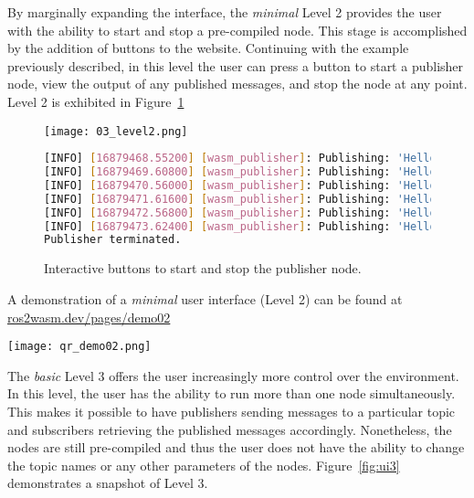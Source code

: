         By marginally expanding the interface, the \textit{minimal} Level 2 provides
        the user with the ability to start and stop a pre-compiled node. This 
        stage is accomplished by the addition of buttons to the website. Continuing
        with the example previously described, in this level the user can press
        a button to start a publisher node, view the output of any published 
        messages, and stop the node at any point. Level 2 is exhibited in Figure~\ref{fig:ui2}

        \begin{figure}[htbp]
            \centering
            \texttt{[image: 03\_level2.png]}
            \begin{lstlisting}[language=Bash]
[INFO] [16879468.55200] [wasm_publisher]: Publishing: 'Hello there! 13'
[INFO] [16879469.60800] [wasm_publisher]: Publishing: 'Hello there! 14'
[INFO] [16879470.56000] [wasm_publisher]: Publishing: 'Hello there! 15'
[INFO] [16879471.61600] [wasm_publisher]: Publishing: 'Hello there! 16'
[INFO] [16879472.56800] [wasm_publisher]: Publishing: 'Hello there! 17'
[INFO] [16879473.62400] [wasm_publisher]: Publishing: 'Hello there! 18'
Publisher terminated.\end{lstlisting}
            \caption{Interactive buttons to start and stop the publisher node.}\label{fig:ui2}
        \end{figure}

        \begin{tcolorbox}[title=Example 2]
            \begin{minipage}[t]{0.87\linewidth}
                \vspace*{0.5\baselineskip}
                A demonstration of a \textit{minimal} user interface (Level 2) can
                be found at \href{https://ros2wasm.dev/pages/demo02/index.html}{\textsf{ros2wasm.dev/pages/demo02}}
            \end{minipage}\hfill%
            \begin{minipage}[t]{0.1\linewidth}
                \vspace*{0pt}
                \texttt{[image: qr\_demo02.png]}
            \end{minipage}
        \end{tcolorbox}



        The \textit{basic} Level 3 offers the user increasingly more control over
        the environment. In this level, the user has the ability to run more than
        one node simultaneously. This makes it possible to have publishers sending
        messages to a particular topic and subscribers retrieving the published
        messages accordingly. Nonetheless, the nodes are still pre-compiled and 
        thus the user does not have the ability to change the topic names or any
        other parameters of the nodes. Figure~\ref{fig:ui3} demonstrates a snapshot 
        of Level 3.

